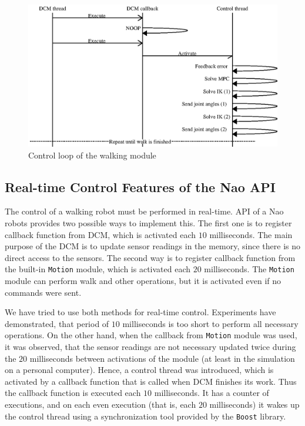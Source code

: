 \begin{figure}[ht]
    \centerline{%
    \includegraphics[scale=0.8]{Figures/nao_mod_seq.eps}}
    \caption{Control loop of the walking module}
    \label{fig.seq}
\end{figure}


\subsection{Real-time Control Features of the Nao API}
The control of a walking robot must be performed in real-time. \ac{API} of a Nao
robots provides two possible ways to implement this. The first one is to register 
callback function from \ac{DCM}, which is activated each $10$ milliseconds. The main
purpose of the \ac{DCM} is to update sensor readings in the memory, since there is
no direct access to the sensors. The second way is to register callback function 
from the built-in \verb|Motion| module, which is activated each $20$ milliseconds. 
The \verb|Motion| module can perform walk and other operations, but it is activated
even if no commands were sent. 

We have tried to use both methods for real-time control. Experiments have 
demonstrated, that period of $10$ milliseconds is too short to perform all necessary 
operations. On the other hand, when the callback from \verb|Motion| module was
used, it was observed, that the sensor readings are not necessary updated twice
during the $20$ milliseconds between activations of the module (at least in the
simulation on a personal computer). Hence, a control thread was introduced, which 
is activated by a callback function that is called when \ac{DCM} finishes its work. 
Thus the callback function is executed each $10$ milliseconds. It has a counter of 
executions, and on each even execution (that is, each $20$ milliseconds) it wakes up 
the control thread using a synchronization tool provided by the \verb|Boost| library. 

